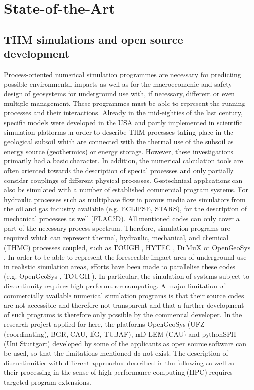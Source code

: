 \section{State-of-the-Art} 

\subsection{THM simulations and open source development}

Process-oriented numerical simulation programmes are necessary for predicting possible environmental impacts as well as for the macroeconomic and safety design of geosystems for underground use with, if necessary, different or even multiple management. These programmes must be able to represent the running processes and their interactions. Already in the mid-eighties of the last century, specific models were developed in the USA and partly implemented in scientific simulation platforms in order to describe THM processes taking place in the geological subsoil which are connected with the thermal use of the subsoil as energy source (geothermics) or energy storage. However, these investigations primarily had a basic character. In addition, the numerical calculation tools are often oriented towards the description of special processes and only partially consider couplings of different physical processes. Geotechnical applications can also be simulated with a number of established commercial program systems. For hydraulic processes such as multiphase flow in porous media are simulators from the oil and gas industry available (e.g. ECLIPSE, STARS), for the description of mechanical processes as well (FLAC3D). All mentioned codes can only cover a part of the necessary process spectrum. Therefore, simulation programs are required which can represent thermal, hydraulic, mechanical, and chemical (THMC) processes coupled, such as TOUGH \cite{Pruess2004738}, HYTEC \cite{vanderLee2002599}, DuMuX \cite{Flemisch20111102} or OpenGeoSys \cite{Kolditz2012613}. In order to be able to represent the foreseeable impact area of underground use in realistic simulation areas, efforts have been made to parallelise these codes (e.g. OpenGeoSys \cite{Wang20152269}, TOUGH \cite{Wu2002243}). In particular, the simulation of systems subject to discontinuity requires high performance computing. A major limitation of commercially available numerical simulation programs is that their source codes are not accessible and therefore not transparent and that a further development of such programs is therefore only possible by the commercial developer. In the research project applied for here, the platforms OpenGeoSys (UFZ (coordinating), BGR, CAU, IfG, TUBAF), mD-LEM (CAU) and pythonSPH (Uni Stuttgart) developed by some of the applicants as open source software can be used, so that the limitations mentioned do not exist. The description of discontinuities with different approaches described in the following as well as their processing in the sense of high-performance computing (HPC) requires targeted program extensions.

